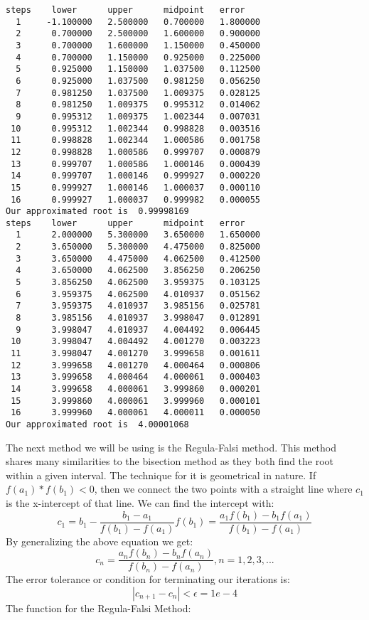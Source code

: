 \documentclass[12pt]{article}
\begin{document}
\begin{lstlisting}[style=Matlab-editor]
steps    lower      upper      midpoint   error
  1     -1.100000   2.500000   0.700000   1.800000
  2      0.700000   2.500000   1.600000   0.900000
  3      0.700000   1.600000   1.150000   0.450000
  4      0.700000   1.150000   0.925000   0.225000
  5      0.925000   1.150000   1.037500   0.112500
  6      0.925000   1.037500   0.981250   0.056250
  7      0.981250   1.037500   1.009375   0.028125
  8      0.981250   1.009375   0.995312   0.014062
  9      0.995312   1.009375   1.002344   0.007031
 10      0.995312   1.002344   0.998828   0.003516
 11      0.998828   1.002344   1.000586   0.001758
 12      0.998828   1.000586   0.999707   0.000879
 13      0.999707   1.000586   1.000146   0.000439
 14      0.999707   1.000146   0.999927   0.000220
 15      0.999927   1.000146   1.000037   0.000110
 16      0.999927   1.000037   0.999982   0.000055
Our approximated root is  0.99998169
steps    lower      upper      midpoint   error
  1      2.000000   5.300000   3.650000   1.650000
  2      3.650000   5.300000   4.475000   0.825000
  3      3.650000   4.475000   4.062500   0.412500
  4      3.650000   4.062500   3.856250   0.206250
  5      3.856250   4.062500   3.959375   0.103125
  6      3.959375   4.062500   4.010937   0.051562
  7      3.959375   4.010937   3.985156   0.025781
  8      3.985156   4.010937   3.998047   0.012891
  9      3.998047   4.010937   4.004492   0.006445
 10      3.998047   4.004492   4.001270   0.003223
 11      3.998047   4.001270   3.999658   0.001611
 12      3.999658   4.001270   4.000464   0.000806
 13      3.999658   4.000464   4.000061   0.000403
 14      3.999658   4.000061   3.999860   0.000201
 15      3.999860   4.000061   3.999960   0.000101
 16      3.999960   4.000061   4.000011   0.000050
Our approximated root is  4.00001068
\end{lstlisting}   
\pagebreak


The next method we will be using is the Regula-Falsi method. This method shares many similarities to the bisection method as they both find the root within a given interval. The technique for it is geometrical in nature. If $f(a_{1})*f(b_{1}) < 0$, then we connect the two points with a straight line where $c_{1}$ is the x-intercept of that line. We can find the intercept with:
\begin{equation*}
c_{1}=b_{1}-\frac{b_{1}-a_{1}}{f(b_{1})-f(a_{1})}f(b_{1}) = \frac{a_{1}f(b_{1})-b_{1}f(a_{1})}{f(b_{1})-f(a_{1})}
\end{equation*}
By generalizing the above equation we get:
\begin{equation*}
c_{n}=\frac{a_{n}f(b_{n})-b_{n}f(a_{n})}{f(b_{n})-f(a_{n})},n=1,2,3,...
\end{equation*}
The error tolerance or condition for terminating our iterations is:
\begin{equation*}
|c_{n+1}-c_{n}|<\epsilon = 1e-4
\end{equation*}
The function for the Regula-Falsi Method:
\end{document}
